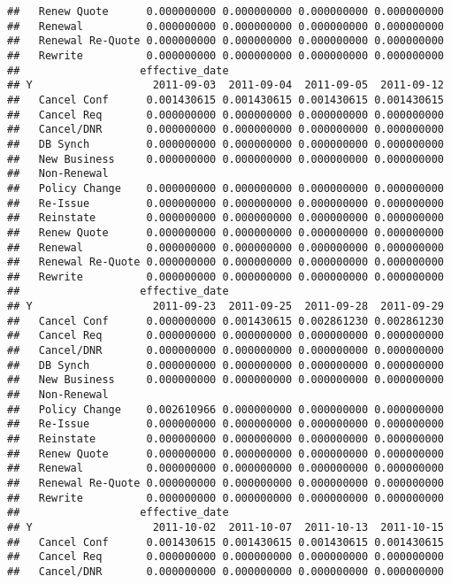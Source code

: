 \documentclass[]{article}
\begin{document}
\begin{verbatim}
##   Renew Quote      0.000000000 0.000000000 0.000000000 0.000000000
##   Renewal          0.000000000 0.000000000 0.000000000 0.000000000
##   Renewal Re-Quote 0.000000000 0.000000000 0.000000000 0.000000000
##   Rewrite          0.000000000 0.000000000 0.000000000 0.000000000
##                   effective_date
## Y                   2011-09-03  2011-09-04  2011-09-05  2011-09-12
##   Cancel Conf      0.001430615 0.001430615 0.001430615 0.001430615
##   Cancel Req       0.000000000 0.000000000 0.000000000 0.000000000
##   Cancel/DNR       0.000000000 0.000000000 0.000000000 0.000000000
##   DB Synch         0.000000000 0.000000000 0.000000000 0.000000000
##   New Business     0.000000000 0.000000000 0.000000000 0.000000000
##   Non-Renewal                                                     
##   Policy Change    0.000000000 0.000000000 0.000000000 0.000000000
##   Re-Issue         0.000000000 0.000000000 0.000000000 0.000000000
##   Reinstate        0.000000000 0.000000000 0.000000000 0.000000000
##   Renew Quote      0.000000000 0.000000000 0.000000000 0.000000000
##   Renewal          0.000000000 0.000000000 0.000000000 0.000000000
##   Renewal Re-Quote 0.000000000 0.000000000 0.000000000 0.000000000
##   Rewrite          0.000000000 0.000000000 0.000000000 0.000000000
##                   effective_date
## Y                   2011-09-23  2011-09-25  2011-09-28  2011-09-29
##   Cancel Conf      0.000000000 0.001430615 0.002861230 0.002861230
##   Cancel Req       0.000000000 0.000000000 0.000000000 0.000000000
##   Cancel/DNR       0.000000000 0.000000000 0.000000000 0.000000000
##   DB Synch         0.000000000 0.000000000 0.000000000 0.000000000
##   New Business     0.000000000 0.000000000 0.000000000 0.000000000
##   Non-Renewal                                                     
##   Policy Change    0.002610966 0.000000000 0.000000000 0.000000000
##   Re-Issue         0.000000000 0.000000000 0.000000000 0.000000000
##   Reinstate        0.000000000 0.000000000 0.000000000 0.000000000
##   Renew Quote      0.000000000 0.000000000 0.000000000 0.000000000
##   Renewal          0.000000000 0.000000000 0.000000000 0.000000000
##   Renewal Re-Quote 0.000000000 0.000000000 0.000000000 0.000000000
##   Rewrite          0.000000000 0.000000000 0.000000000 0.000000000
##                   effective_date
## Y                   2011-10-02  2011-10-07  2011-10-13  2011-10-15
##   Cancel Conf      0.001430615 0.001430615 0.001430615 0.001430615
##   Cancel Req       0.000000000 0.000000000 0.000000000 0.000000000
##   Cancel/DNR       0.000000000 0.000000000 0.000000000 0.000000000

\end{verbatim}
\end{document}
